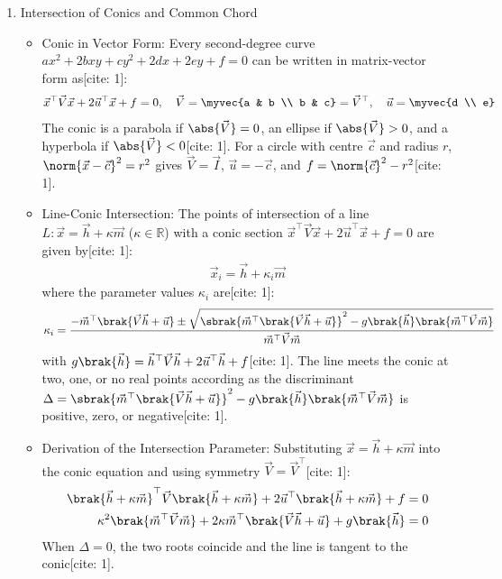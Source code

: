 \begin{enumerate}[label=\thesubsection.\arabic*, ref=\thesubsection.\theenumi,itemsep=0pt]

\item Intersection of Conics and Common Chord
\begin{itemize}
\item Conic in Vector Form:
Every second-degree curve $ax^2 + 2bxy + cy^2 + 2dx + 2ey + f = 0$ can be written in matrix-vector form as[cite: 1]:
\begin{align}
\vec{x}^\top \vec{V} \vec{x} + 2\vec{u}^\top \vec{x} + f = 0, \quad \vec{V} = \myvec{a & b \\ b & c} = \vec{V}^\top, \quad \vec{u} = \myvec{d \\ e}
\end{align}
The conic is a parabola if $\abs{\vec{V}} = 0$, an ellipse if $\abs{\vec{V}} > 0$, and a hyperbola if $\abs{\vec{V}} < 0$[cite: 1]. For a circle with centre $\vec{c}$ and radius $r$, $\norm{\vec{x} - \vec{c}}^2 = r^2$ gives $\vec{V} = \vec{I}$, $\vec{u} = -\vec{c}$, and $f = \norm{\vec{c}}^2 - r^2$[cite: 1].

\item Line-Conic Intersection:
The points of intersection of a line $L: \vec{x} = \vec{h} + \kappa \vec{m}$ ($\kappa \in \mathbb{R}$) with a conic section $\vec{x}^\top \vec{V} \vec{x} + 2\vec{u}^\top \vec{x} + f = 0$ are given by[cite: 1]:
\begin{align}
\vec{x}_i = \vec{h} + \kappa_i \vec{m}
\end{align}
where the parameter values $\kappa_i$ are[cite: 1]:
\begin{align}
\kappa_i = \frac{-\vec{m}^\top \brak{\vec{V}\vec{h} + \vec{u}} \pm \sqrt{\sbrak{\vec{m}^\top \brak{\vec{V}\vec{h} + \vec{u}}}^2 - g\brak{\vec{h}}\brak{\vec{m}^\top \vec{V} \vec{m}}}}{\vec{m}^\top \vec{V} \vec{m}}
\end{align}
with $g\brak{\vec{h}} = \vec{h}^\top \vec{V} \vec{h} + 2\vec{u}^\top \vec{h} + f$[cite: 1]. The line meets the conic at two, one, or no real points according as the discriminant $\Delta = \sbrak{\vec{m}^\top \brak{\vec{V}\vec{h} + \vec{u}}}^2 - g\brak{\vec{h}}\brak{\vec{m}^\top \vec{V} \vec{m}}$ is positive, zero, or negative[cite: 1].

\item Derivation of the Intersection Parameter:
Substituting $\vec{x} = \vec{h} + \kappa \vec{m}$ into the conic equation and using symmetry $\vec{V} = \vec{V}^\top$[cite: 1]:
\begin{align}
\brak{\vec{h} + \kappa \vec{m}}^\top \vec{V} \brak{\vec{h} + \kappa \vec{m}} + 2\vec{u}^\top \brak{\vec{h} + \kappa \vec{m}} + f &= 0 \\
\kappa^2 \brak{\vec{m}^\top \vec{V} \vec{m}} + 2\kappa \vec{m}^\top \brak{\vec{V}\vec{h} + \vec{u}} + g\brak{\vec{h}} &= 0
\end{align}
When $\Delta = 0$, the two roots coincide and the line is tangent to the conic[cite: 1].


\end{itemize}
\end{enumerate}
